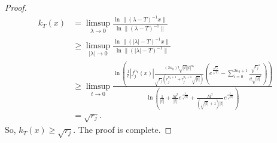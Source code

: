 \documentclass[10pt,a4paper]{amsart}
\begin{document}
\begin{proof}
\begin{align*}
k_{T}(x)
&=\limsup_{\lambda\rightarrow 0}
\frac{\ln\|(\lambda-T)^{-1}x\|}{\ln\|(\lambda-T)^{-1}\|}\\
&\geq\limsup_{|\lambda|\rightarrow 0}
\frac{\ln\|(|\lambda|-T)^{-1}x\|}{\ln\|(|\lambda|-T)^{-1}\|}\\
&\geq\limsup_{t\rightarrow 0}
\frac{\ln\left(\frac{1}{c}\left|f_{j}^{n_0}(x)\right|\frac{(2n_0)!\sqrt{|t|}|t|^{n_0}}{\sqrt{r_j}\left(r_j^{n_0+1}+r_j^{n_0+1}\sqrt{|t|}\right)}
\left(e^{\frac{\sqrt{r_j}}{\sqrt{|t|}}}-\sum_{i=0}^{2n_0+1}\frac{\sqrt{r_j}^i}{i!\sqrt{|t|}^{i}}\right)\right)}
{\ln\left(\frac{1}{|t|}+ \frac{M^2}{|t|}e^{\frac{1}{\sqrt{|t|}}}+
\frac{M^2}{(\sqrt{|t|}+1)|t|}e^{\frac{1}{\sqrt{|t|}}}\right)}\\
&=\sqrt{r_j}.
\end{align*}
So, $k_{T}(x)\geq \sqrt{r_j}$.
The proof is complete.
\end{proof}
\end{document}
